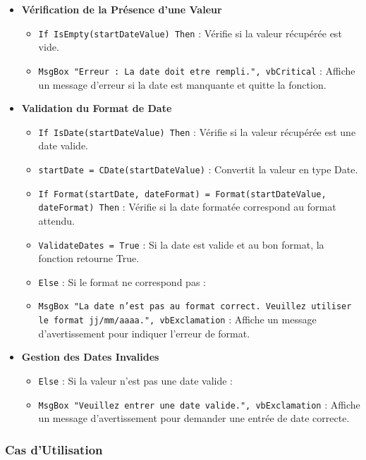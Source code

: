 \documentclass[a4paper, oneside, 12pt, final]{extreport}
\begin{document}
\begin{itemize}
    \item \textbf{Vérification de la Présence d'une Valeur}
    \begin{itemize}
        \item \texttt{If IsEmpty(startDateValue) Then} : Vérifie si la valeur récupérée est vide.
        \item \texttt{MsgBox "Erreur : La date doit etre rempli.", vbCritical} : Affiche un message d'erreur si la date est manquante et quitte la fonction.
    \end{itemize}

    \item \textbf{Validation du Format de Date}
    \begin{itemize}
        \item \texttt{If IsDate(startDateValue) Then} : Vérifie si la valeur récupérée est une date valide.
        \item \texttt{startDate = CDate(startDateValue)} : Convertit la valeur en type Date.
        \item \texttt{If Format(startDate, dateFormat) = Format(startDateValue, dateFormat) Then} : Vérifie si la date formatée correspond au format attendu.
        \item \texttt{ValidateDates = True} : Si la date est valide et au bon format, la fonction retourne True.
        \item \texttt{Else} : Si le format ne correspond pas :
        \item \texttt{MsgBox "La date n'est pas au format correct. Veuillez utiliser le format jj/mm/aaaa.", vbExclamation} : Affiche un message d'avertissement pour indiquer l'erreur de format.
    \end{itemize}

    \item \textbf{Gestion des Dates Invalides}
    \begin{itemize}
        \item \texttt{Else} : Si la valeur n'est pas une date valide :
        \item \texttt{MsgBox "Veuillez entrer une date valide.", vbExclamation} : Affiche un message d'avertissement pour demander une entrée de date correcte.
    \end{itemize}
\end{itemize}

\subsubsection{Cas d'Utilisation}
\end{document}
